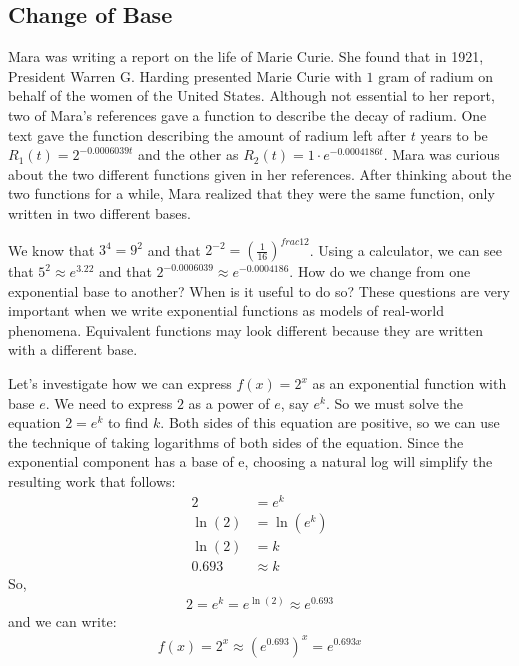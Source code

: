 \documentclass[10pt,]{book}
\theoremstyle{ptxdefinitionnotitle}
\theoremstyle{ptxdefinitiontitle}
\theoremstyle{ptxdefinitionnotitle}
\theoremstyle{ptxdefinitiontitle}
\theoremstyle{ptxdefinitionnotitle}
\theoremstyle{ptxdefinitiontitle}
\numberwithin{equation}{section}
\newcommand{\amp}{&}
\begin{document}
\subsection[{Change of Base}]{Change of Base}\label{subsection-5}
\hypertarget{p-378}{}%
Mara was writing a report on the life of Marie Curie.  She found that in 1921, President Warren G. Harding presented Marie Curie with \(1\) gram of radium on behalf of the women of the United States.  Although not essential to her report, two of Mara's references gave a function to describe the decay of radium. One text gave the function describing the amount of radium left after \(t\) years to be \(R_1(t) = 2^{-0.0006039t}\) and the other as \(R_2(t) = 1 \cdot e^{-0.0004186t}\).  Mara was curious about the two different functions given in her references. After thinking about the two functions for a while, Mara realized that they were the same function, only written in two different bases.%
\par
\hypertarget{p-379}{}%
We know that \(3^4 = 9^2\) and that \(2^{-2} = \left( \frac{1}{16} \right)^{frac{1}{2}}\). Using a calculator, we can see that \(5^2 \approx e^3.22\) and that \(2^{-0.0006039} \approx e^{-0.0004186}\). How do we change from one exponential base to another? When is it useful to do so? These questions are very important when we write exponential functions as models of real-world phenomena. Equivalent functions may look different because they are written with a different base.%
\par
\hypertarget{p-380}{}%
Let's investigate how we can express \(f(x) = 2^x\) as an exponential function with base \(e\). We need to express \(2\) as a power of \(e\), say \(e^k\). So we must solve the equation \(2 = e^k\) to find \(k\).  Both sides of this equation are positive, so we can use the technique of taking logarithms of both sides of the equation. Since the exponential component has a base of e, choosing a natural log will simplify the resulting work that follows:%
\begin{align*}
2 \amp = e^k\\
\ln \left( 2 \right) \amp = \ln \left( e^k \right)\\
\ln \left( 2 \right) \amp = k\\
0.693 \amp \approx k
\end{align*}
So,%
\begin{gather*}
2 = e^k = e^{\ln(2)} \approx e^{0.693}
\end{gather*}
and we can write:%
\begin{gather*}
f(x) = 2^x \approx \left( e^{0.693} \right)^x = e^{0.693x}
\end{gather*}
\end{document}
